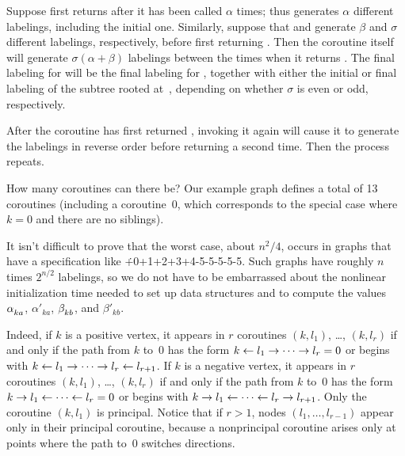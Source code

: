 Suppose  first returns  after it has
been called
$\alpha$ times; thus  generates $\alpha$ different
labelings,
including the initial one. Similarly, suppose that 
and  generate $\beta$ and $\sigma$
different labelings, respectively, before first returning .
Then the coroutine 
itself will generate $\sigma(\alpha+\beta)$ labelings between the times
when it returns .
The final labeling for  will be the final labeling
for , together with either the initial or final labeling of
the subtree
rooted at~, depending on whether $\sigma$ is even or odd, respectively.

After the coroutine has first returned , invoking it again will
cause it to generate the labelings in reverse order before
returning  a second time. Then the process repeats.

\fi

How many coroutines can there be? Our example graph
defines a total of
13 coroutines (including a coroutine~0, which corresponds to the special
case where $k=0$ and there are no siblings).

It isn't difficult to prove that the worst case, about $n^2\!/4$, occurs in
graphs that have a specification like \.{+0+1+2+3+4-5-5-5-5-5}.
Such graphs have roughly $n$ times $2^{n/2}$ labelings, so we do not have to be
embarrassed about the nonlinear initialization time needed to set up
data structures and to compute the values $\alpha\losub{ka}$, $\alpha'_{ka}$,
$\beta\losub{kb}$, and $\beta'_{kb}$.

Indeed, if $k$ is a positive vertex, it appears in $r$ coroutines
$(k,l_1)$, \dots, $(k,l_r)$ if and only if the path from $k$ to~0
has the form $k\gets l_1\to\cdots\to l_r=0$ or begins with
$k\gets l_1\to\cdots\to l_r\gets l_{r+1}$.
If $k$ is a negative vertex, it appears in $r$ coroutines
$(k,l_1)$, \dots, $(k,l_r)$ if and only if the path from $k$ to~0
has the form $k\to l_1\gets\cdots\gets l_r=0$ or begins with
$k\to l_1\gets\cdots\gets l_r\to l_{r+1}$.
Only the coroutine $(k,l_1)$ is principal. Notice that if $r>1$,
nodes $(l_1,\ldots,l_{r-1})$ appear only in their principal coroutine,
because a nonprincipal coroutine arises only at points where the path to~0
switches directions.

